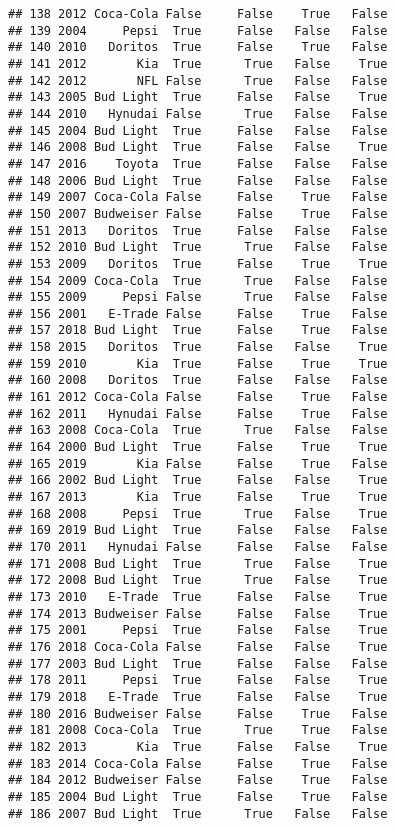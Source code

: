 \documentclass[
]{article}
\begin{document}
\begin{verbatim}
## 138 2012 Coca-Cola False     False    True   False
## 139 2004     Pepsi  True     False   False   False
## 140 2010   Doritos  True     False    True   False
## 141 2012       Kia  True      True   False    True
## 142 2012       NFL False      True   False   False
## 143 2005 Bud Light  True     False   False    True
## 144 2010   Hynudai False      True   False   False
## 145 2004 Bud Light  True     False   False   False
## 146 2008 Bud Light  True     False   False    True
## 147 2016    Toyota  True     False   False   False
## 148 2006 Bud Light  True     False   False   False
## 149 2007 Coca-Cola False     False    True   False
## 150 2007 Budweiser False     False    True   False
## 151 2013   Doritos  True     False   False   False
## 152 2010 Bud Light  True      True   False   False
## 153 2009   Doritos  True     False    True    True
## 154 2009 Coca-Cola  True      True   False   False
## 155 2009     Pepsi False      True   False   False
## 156 2001   E-Trade False     False    True   False
## 157 2018 Bud Light  True     False    True   False
## 158 2015   Doritos  True     False   False    True
## 159 2010       Kia  True     False    True    True
## 160 2008   Doritos  True     False   False   False
## 161 2012 Coca-Cola False     False    True   False
## 162 2011   Hynudai False     False    True   False
## 163 2008 Coca-Cola  True      True   False   False
## 164 2000 Bud Light  True     False    True    True
## 165 2019       Kia False     False    True   False
## 166 2002 Bud Light  True     False   False    True
## 167 2013       Kia  True     False    True    True
## 168 2008     Pepsi  True      True   False    True
## 169 2019 Bud Light  True     False   False   False
## 170 2011   Hynudai False     False   False   False
## 171 2008 Bud Light  True      True   False    True
## 172 2008 Bud Light  True      True   False    True
## 173 2010   E-Trade  True     False   False    True
## 174 2013 Budweiser False     False   False    True
## 175 2001     Pepsi  True     False   False    True
## 176 2018 Coca-Cola False     False   False    True
## 177 2003 Bud Light  True     False   False   False
## 178 2011     Pepsi  True     False   False    True
## 179 2018   E-Trade  True     False   False    True
## 180 2016 Budweiser False     False    True   False
## 181 2008 Coca-Cola  True      True    True   False
## 182 2013       Kia  True     False   False    True
## 183 2014 Coca-Cola False     False    True   False
## 184 2012 Budweiser False     False    True   False
## 185 2004 Bud Light  True     False    True   False
## 186 2007 Bud Light  True      True   False   False

\end{verbatim}
\end{document}
